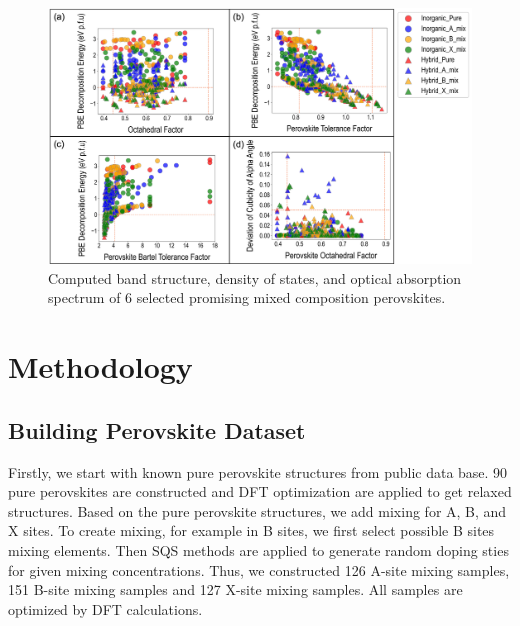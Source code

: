 \documentclass[twoside,twocolumn,9pt]{article}
\begin{document}
    \begin{figure}[h]
      \centering
      \includegraphics[width=0.99\linewidth]{Figure6.png}
      \caption{\label{Fig:outline} 
        Computed band structure, density of states, and optical absorption
        spectrum of 6 selected promising mixed composition perovskites.
      }
    \end{figure}


    \newpage



    \section*{Methodology}
    \subsection*{Building Perovskite Dataset}
    Firstly, we start with known pure perovskite structures from public
    data base. 90 pure perovskites are constructed and DFT optimization
    are applied to get relaxed structures. Based on the pure perovskite
    structures, we add mixing for A, B, and X sites. To create mixing, for
    example in B sites, we first select possible B sites mixing
    elements. Then SQS methods are applied to generate random doping sties
    for given mixing concentrations. Thus, we constructed 126 A-site
    mixing samples, 151 B-site mixing samples and 127 X-site mixing
    samples. All samples are optimized by DFT calculations.
\end{document}
